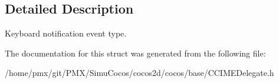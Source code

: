 \subsection{Detailed Description}
Keyboard notification event type. 

The documentation for this struct was generated from the following file\+:\begin{DoxyCompactItemize}
\item 
/home/pmx/git/\+P\+M\+X/\+Simu\+Cocos/cocos2d/cocos/base/C\+C\+I\+M\+E\+Delegate.\+h\end{DoxyCompactItemize}
